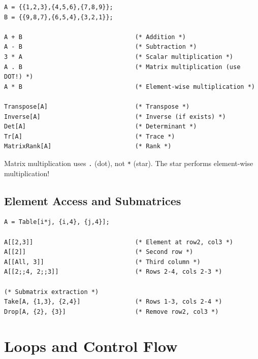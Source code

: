 \documentclass[12pt,a4paper]{article}
\begin{document}
\begin{commandbox}
\begin{lstlisting}
A = {{1,2,3},{4,5,6},{7,8,9}};
B = {{9,8,7},{6,5,4},{3,2,1}};

A + B                               (* Addition *)
A - B                               (* Subtraction *)
3 * A                               (* Scalar multiplication *)
A . B                               (* Matrix multiplication (use DOT!) *)
A * B                               (* Element-wise multiplication *)

Transpose[A]                        (* Transpose *)
Inverse[A]                          (* Inverse (if exists) *)
Det[A]                              (* Determinant *)
Tr[A]                               (* Trace *)
MatrixRank[A]                       (* Rank *)
\end{lstlisting}
\end{commandbox}

\begin{warningbox}
Matrix multiplication uses \texttt{.} (dot), not \texttt{*} (star). The star performs element-wise multiplication!
\end{warningbox}

\subsection{Element Access and Submatrices}

\begin{commandbox}[Indexing]
\begin{lstlisting}
A = Table[i*j, {i,4}, {j,4}];

A[[2,3]]                            (* Element at row2, col3 *)
A[[2]]                              (* Second row *)
A[[All, 3]]                         (* Third column *)
A[[2;;4, 2;;3]]                     (* Rows 2-4, cols 2-3 *)

(* Submatrix extraction *)
Take[A, {1,3}, {2,4}]               (* Rows 1-3, cols 2-4 *)
Drop[A, {2}, {3}]                   (* Remove row2, col3 *)
\end{lstlisting}
\end{commandbox}

\section{Loops and Control Flow}
\end{document}
